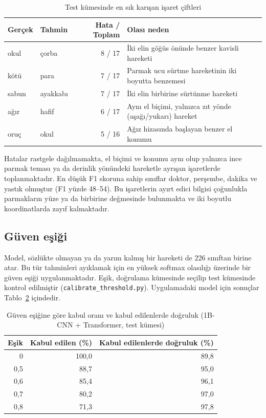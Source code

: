 \begin{table}[H]
\centering
\caption{Test kümesinde en sık karışan işaret çiftleri}
\label{tab:karisan}
\small
\begin{tabularx}{\textwidth}{@{}l l r X@{}}
\toprule
\textbf{Gerçek} & \textbf{Tahmin} & \textbf{Hata / Toplam} & \textbf{Olası neden} \\
\midrule
okul & çorba & 8 / 17 & İki elin göğüs önünde benzer kavisli hareketi \\
kötü & para & 7 / 17 & Parmak ucu sürtme hareketinin iki boyutta benzemesi \\
sabun & ayakkabı & 7 / 17 & İki elin birbirine sürtünme hareketi \\
ağır & hafif & 6 / 17 & Aynı el biçimi, yalnızca zıt yönde (aşağı/yukarı) hareket \\
oruç & okul & 5 / 16 & Ağız hizasında başlayan benzer el konumu \\
\bottomrule
\end{tabularx}
\end{table}

Hatalar rastgele dağılmamakta, el biçimi ve konumu aynı olup yalnızca ince parmak
teması ya da derinlik yönündeki hareketle ayrışan işaretlerde toplanmaktadır. En düşük
F1 skoruna sahip sınıflar \sol doktor\sag, \sol perşembe\sag, \sol dakika\sag{} ve
\sol yastık\sag{} olmuştur (F1 yüzde 48--54). Bu işaretlerin ayırt edici bilgisi
çoğunlukla parmakların yüze ya da birbirine değmesinde bulunmakta ve iki boyutlu
koordinatlarda zayıf kalmaktadır.

\subsection{Güven eşiği}

Model, sözlükte olmayan ya da yarım kalmış bir hareketi de 226 sınıftan birine atar. Bu
tür tahminleri ayıklamak için en yüksek softmax olasılığı üzerinde bir güven eşiği
uygulanmaktadır. Eşik, doğrulama kümesinde seçilip test kümesinde kontrol edilmiştir
(\texttt{calibrate\_threshold.py}). Uygulamadaki model için sonuçlar
Tablo~\ref{tab:esik} içindedir.

\begin{table}[H]
\centering
\caption{Güven eşiğine göre kabul oranı ve kabul edilenlerde doğruluk (1B-CNN + Transformer, test kümesi)}
\label{tab:esik}
\begin{tabular}{@{}rrr@{}}
\toprule
\textbf{Eşik} & \textbf{Kabul edilen (\%)} & \textbf{Kabul edilenlerde doğruluk (\%)} \\
\midrule
0 & 100,0 & 89,8 \\
0,5 & 88,7 & 95,0 \\
0,6 & 85,4 & 96,1 \\
0,7 & 80,2 & 97,0 \\
0,8 & 71,3 & 97,8 \\
\bottomrule
\end{tabular}
\end{table}

